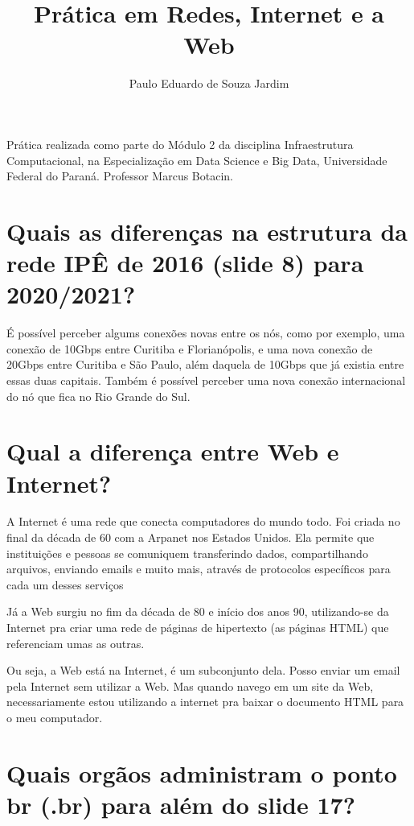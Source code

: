 \documentclass{article}
\title{Prática em Redes, Internet e a Web}
\author{Paulo Eduardo de Souza Jardim}
\begin{document}
\maketitle

\begin{large} 
  Prática realizada como parte do Módulo 2 da disciplina Infraestrutura Computacional, na Especialização em Data Science e Big Data, Universidade Federal do Paraná. Professor Marcus Botacin.
\end{large} 

\section{Quais as diferenças na estrutura da rede IPÊ de 2016 (slide 8) para 2020/2021?}
É possível perceber algums conexões novas entre os nós, como por exemplo, uma conexão de 10Gbps entre Curitiba e Florianópolis, e uma nova conexão de 20Gbps entre Curitiba e São Paulo, além daquela de 10Gbps que já existia entre essas duas capitais.
Também é possível perceber uma nova conexão internacional do nó que fica no Rio Grande do Sul.

\section{Qual a diferença entre Web e Internet?} 

A Internet é uma rede que conecta computadores do mundo todo. Foi criada no final da década de 60 com a Arpanet nos Estados Unidos. Ela permite que instituições e pessoas se comuniquem transferindo dados, compartilhando arquivos, enviando emails e muito mais, através de protocolos específicos para cada um desses serviços

Já a Web surgiu no fim da década de 80 e início dos anos 90, utilizando-se da Internet pra criar uma rede de páginas de hipertexto (as páginas HTML) que referenciam umas as outras. 

Ou seja, a Web está na Internet, é um subconjunto dela. Posso enviar um email pela Internet sem utilizar a Web.
Mas quando navego em um site da Web, necessariamente estou utilizando a internet pra baixar o documento HTML para o meu computador.

\section{Quais orgãos administram o ponto br (.br) para além do slide 17?}
\end{document}

